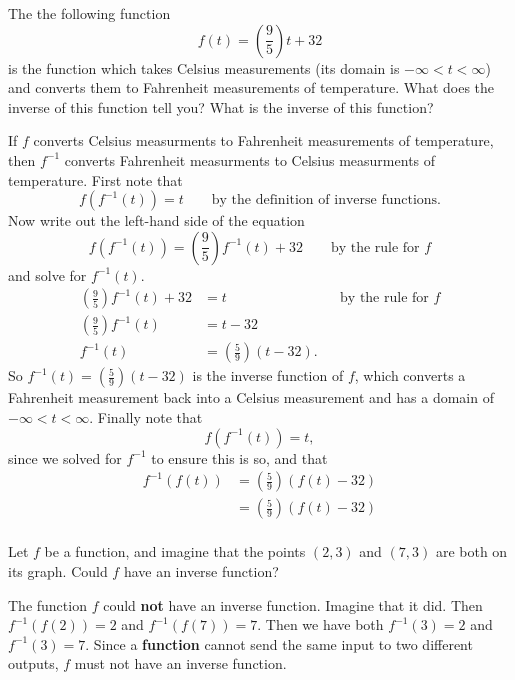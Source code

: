 \documentclass{ximera}
\begin{document}
\begin{example}
  The the following function
  \[
  f(t) = \left(\frac{9}{5}\right) t + 32
  \]	
  is the function which takes Celsius measurements (its domain is
  $-\infty < t < \infty$) and converts them to Fahrenheit
  measurements of temperature.  What does the inverse of this function
  tell you? What is the inverse of this function?

  \begin{explanation}
    If $f$ converts Celsius measurments to Fahrenheit measurements of
    temperature, then $f^{-1}$ converts Fahrenheit measurments to
    Celsius measurments of temperature. First note that 
    \[
    f(f^{-1}(t)) = t \qquad \text{by the definition of inverse
      functions.}
    \]
    Now write out the left-hand side of the equation
    \[
    f(f^{-1}(t)) = \left(\frac{9}{5}\right) f^{-1}(t)+32\qquad\text{by the rule for $f$}
    \]
    and solve for $f^{-1}(t)$.
    \begin{align*}
      \left(\frac{9}{5}\right) f^{-1}(t)+32 &= t &&\text{by the rule for $f$}\\
      \left(\frac{9}{5}\right) f^{-1}(t)&= t -32\\
      f^{-1}(t) &= \left(\frac{5}{9}\right)(t - 32).
    \end{align*}
    So $f^{-1}(t) = \left(\frac{5}{9}\right)(t - 32)$ is the inverse
    function of $f$, which converts a Fahrenheit measurement back into
    a Celsius measurement and has a domain of $-\infty < t <\infty$.
    Finally note that
    \[
    f(f^{-1}(t)) = t,
    \]
    since we solved for $f^{-1}$ to ensure this is so, and that
    \begin{align*}
    f^{-1}(f(t)) &=\left(\frac{5}{9}\right)(f(t) - 32)\\
    &= \left(\frac{5}{9}\right)(f(t) - 32)\\
    \end{align*}
  \end{explanation}
\end{example}






\begin{question}
  Let $f$ be a function, and imagine that the points $(2,3)$ and
  $(7,3)$ are both on its graph.  Could $f$ have an inverse function?
  \begin{multipleChoice}
  \end{multipleChoice}
  \begin{feedback}
    The function $f$ could \textbf{not} have an inverse function.
    Imagine that it did.  Then $f^{-1}(f(2)) = 2$ and $f^{-1}(f(7)) =
    7$.  Then we have both $f^{-1}(3) = 2$ and $f^{-1}(3) = 7$.  Since
    a \textbf{function} cannot send the same input to two different
    outputs, $f$ must not have an inverse function.
  \end{feedback}
\end{question}
\end{document}
